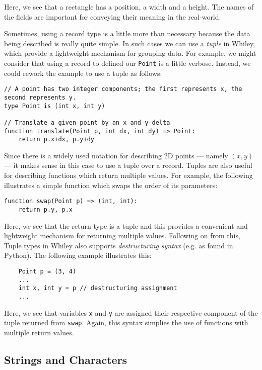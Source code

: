 Here, we see that a rectangle has a position, a width and a height.  The names of the fields are important for conveying their meaning in the real-world.

Sometimes, using a record type is a little more than necessary because the data being described is really quite simple.  In such cases we can use a {\em tuple} in Whiley, which provide a lightweight mechanism for grouping data.  For example, we might consider that using a record to defined our \lstinline{Point} is a little verbose.  Instead, we could rework the example to use a tuple as follows:

\begin{lstlisting}
// A point has two integer components; the first represents x, the second represents y.
type Point is (int x, int y)

// Translate a given point by an x and y delta
function translate(Point p, int dx, int dy) => Point:
    return p.x+dx, p.y+dy
\end{lstlisting}

Since there is a widely used notation for describing 2D points --- namely $(x,y)$ --- it makes sense in this case to use a tuple over a record.  Tuples are also useful for describing functions which return multiple values.  For example, the following illustrates a simple function which swaps the order of its parameters:

\begin{lstlisting}
function swap(Point p) => (int, int):
    return p.y, p.x
\end{lstlisting}

Here, we see that the return type is a tuple and this provides a convenient and lightweight mechanism for returning multiple values.  Following on from this, Tuple types in Whiley also supports {\em destructuring syntax} (e.g. as found in Python).  The following example illustrates this:

\begin{lstlisting}
    Point p = (3, 4)
    ...
    int x, int y = p // destructuring assignment
    ...        
\end{lstlisting}

Here, we see that variables \lstinline{x} and \lstinline{y} are assigned their respective component of the tuple returned from \lstinline{swap}.  Again, this syntax simplies the use of functions with multiple return values.

\subsection{Strings and Characters}


